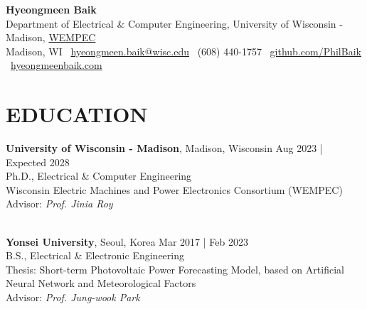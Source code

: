 \documentclass[a4paper,9pt]{extarticle}
\begin{document}
\pagestyle{empty}

\begin{center}
\textbf{\Large Hyeongmeen Baik}\\[7pt] %
Department of Electrical \& Computer Engineering, University of Wisconsin - Madison, \href{https://wempec.wisc.edu/}{WEMPEC}\\
Madison, WI \textbar\ \href{mailto:hyeongmeen.baik@wisc.edu}{hyeongmeen.baik@wisc.edu} \textbar\ (608) 440-1757 \textbar\ \href{https://github.com/PhilBaik}{github.com/PhilBaik} \textbar\ \href{https://www.hyeongmeenbaik.com/}{hyeongmeenbaik.com}
\end{center}

\section*{EDUCATION}
\noindent
\textbf{University of Wisconsin - Madison}, Madison, Wisconsin \hfill Aug 2023 | Expected 2028\\ %
Ph.D., Electrical \& Computer Engineering \hfill \\ %
Wisconsin Electric Machines and Power Electronics Consortium (WEMPEC) \\
Advisor: \textit{Prof. Jinia Roy}

\noindent\\
\textbf{Yonsei University}, Seoul, Korea \hfill Mar 2017 | Feb 2023\\ %
B.S., Electrical \& Electronic Engineering \hfill \\ %
Thesis: Short-term Photovoltaic Power Forecasting Model, based on Artificial Neural Network and Meteorological Factors\\
Advisor: \textit{Prof. Jung-wook Park}\\

\end{document}
